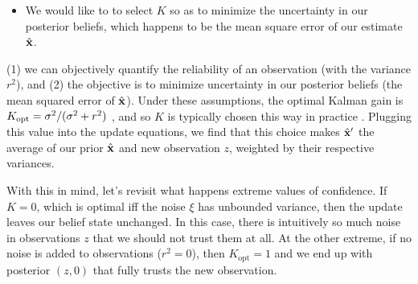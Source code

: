 \begin{example}
{\begin{itemize}
    of the reliability of our observation $z$,
    through the variance $r^2$ of the noise $\xi$.
\item
    We would like to to select $K$ so as to minimize
    the uncertainty in our posterior beliefs, which happens to be
    the mean square error of our estimate $\hat{\mathbf x}$.
\end{itemize}
}
(1) we can objectively quantify the reliability of an observation (with the variance $r^2$),
and (2) the objective is to minimize uncertainty in our posterior beliefs (the mean squared error of $\hat{\mathbf x}$). 
Under these assumptions, the optimal Kalman gain is
$
    K_{\mathrm{opt}}
        = {\sigma^2}/{(\sigma^2 + r^2)}
$
\parencite[p. 146]{brown1997introduction},
and so $K$ is typically chosen this way in practice
\parencite{kalmanfilter.net}.
Plugging this value into the update equations, we find that this choice
makes $\hat{\mathbf x}'$ the average of our prior $\hat{\mathbf x}$ and new observation $z$,
weighted by their respective variances.

With this in mind, let's revisit what happens extreme values of confidence.
If $K = 0$, which
    is optimal
iff the noise $\xi$ has unbounded variance, then
    the update leaves our belief state unchanged.
In this case, there is intuitively so much noise in observations $z$ that
    we should not trust them at all.
%
At the other extreme, if no noise is added to observations ($r^2=0$),
then $K_{\mathrm{opt}} = 1$ and we end up with posterior $(z, 0)$
that fully trusts the new observation.
\end{example}


